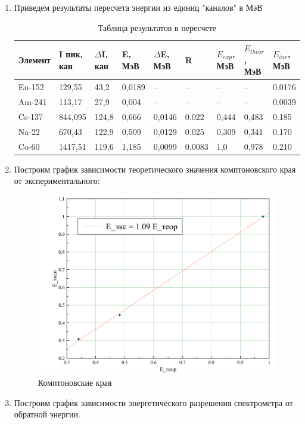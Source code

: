 \documentclass[a4paper,12pt]{article}
\begin{document}
\begin{enumerate}
			
			\item Приведем результаты пересчета энергии из единиц "каналов" в МэВ
			
			\begin{table}[h!]
				\centering
				\label{my-label}
				\begin{tabular}{|l|l|l|l|l|l|l|l|l|}
					\hline
					Элемент & I пик, кан &$\Delta$I, кан  &E, МэВ &$\Delta$E, МэВ &R&$E_{exp}$, МэВ &$E_{theor}$, МэВ&$E_{inv}$, МэВ\\ \hline
					Eu-152 &129,55&43,2&0,0189&--&--&--&--&0.0176\\ \hline
					Am-241 &113,17&27,9&0,004&--&--&--&--&0.0039\\ \hline
					Cs-137 &844,095&124,8&0,666&0,0146&0.022&0,444&0,483&0.185\\ \hline
					Na-22 &670,43&122,9&0,509&0,0129&0.025&0,309&0,341&0.170\\ \hline
					Co-60 &1417,51&119,6&1,185&0,0099&0.0083&1,0&0,978&0.210\\ \hline
				\end{tabular}
				\caption{Таблица результатов в пересчете}
			\end{table}
			
			
			
			\item  Построим график зависимости теоретического значения комптоновского края от экспериментального: 
		
			
			\begin{figure}
				\centering
				\includegraphics[width=0.7\linewidth]{kompt}
				\caption{Комптоновские края}
			\end{figure}
			
			\item 	 Построим график зависимости энергетического разрешения спектрометра от обратной энергии.
				

\end{enumerate}
\end{document}
